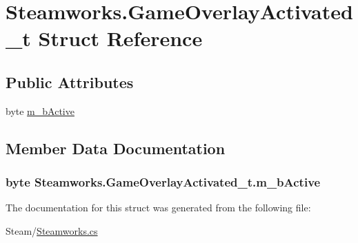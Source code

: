 \hypertarget{struct_steamworks_1_1_game_overlay_activated__t}{}\section{Steamworks.\+Game\+Overlay\+Activated\+\_\+t Struct Reference}
\label{struct_steamworks_1_1_game_overlay_activated__t}
\subsection*{Public Attributes}
\begin{DoxyCompactItemize}
\item 
byte \hyperlink{struct_steamworks_1_1_game_overlay_activated__t_a798991df414a979030470f5adaecee65}{m\+\_\+b\+Active}
\end{DoxyCompactItemize}


\subsection{Member Data Documentation}
\hypertarget{struct_steamworks_1_1_game_overlay_activated__t_a798991df414a979030470f5adaecee65}{}
\subsubsection[{m\+\_\+b\+Active}]{\setlength{\rightskip}{0pt plus 5cm}byte Steamworks.\+Game\+Overlay\+Activated\+\_\+t.\+m\+\_\+b\+Active}\label{struct_steamworks_1_1_game_overlay_activated__t_a798991df414a979030470f5adaecee65}


The documentation for this struct was generated from the following file\+:\begin{DoxyCompactItemize}
\item 
Steam/\hyperlink{_steamworks_8cs}{Steamworks.\+cs}\end{DoxyCompactItemize}
